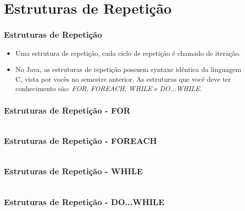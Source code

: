 \documentclass{beamer}
\begin{document}
\section{Estruturas de Repetição}

\begin{frame}
	\frametitle{Estruturas de Repetição}
	\begin{itemize}
		\item Uma estrutura de repetição, cada ciclo de repetição é chamado de iteração.
		\item No Java, as estruturas de repetição possuem syntaxe idêntica da linguagem C, vista por vocês no semestre anterior. As estruturas que você deve ter conhecimento são: \textit{FOR}, \textit{FOREACH}, \textit{WHILE} e \textit{DO...WHILE}.
	\end{itemize}
\end{frame}
\begin{frame}
	\frametitle{Estruturas de Repetição - FOR }
	\begin{example}
		\inputminted[tabsize=1, fontsize=\footnotesize]{java}{codigos/ExemploFor01.java}
	\end{example}
\end{frame}
\begin{frame}
	\frametitle{Estruturas de Repetição - FOREACH }
	\begin{example}
		\inputminted[tabsize=1, fontsize=\footnotesize]{java}{codigos/ExemploFor02.java}
	\end{example}
\end{frame}
\begin{frame}
	\frametitle{Estruturas de Repetição - WHILE }
	\begin{example}
		\inputminted[tabsize=1, fontsize=\footnotesize]{java}{codigos/ExemploWhile01.java}
	\end{example}
\end{frame}
\begin{frame}
	\frametitle{Estruturas de Repetição - DO...WHILE }
	\inputminted[tabsize=1, fontsize=\footnotesize]{java}{codigos/ExemploWhile02.java}
\end{frame}
\end{document}
